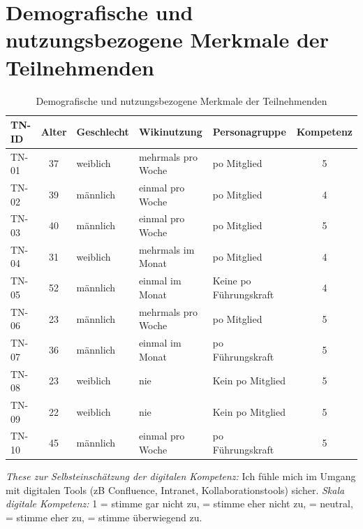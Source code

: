 \section{Demografische und nutzungsbezogene Merkmale der Teilnehmenden}
\label{sec:BB-03_demografie}

\begin{table}[H]
\centering
\caption{Demografische und nutzungsbezogene Merkmale der Teilnehmenden}
\label{tab:BB-demografie}
\begin{tabularx}{\textwidth}{l c l l l c}
\toprule
TN-ID & Alter & Geschlecht & Wikinutzung & Personagruppe & Kompetenz \\
\midrule
TN-01 & 37 & weiblich & mehrmals pro Woche & \acrshort{po} Mitglied & 5 \\
TN-02 & 39 & männlich & einmal pro Woche & \acrshort{po} Mitglied & 4 \\
TN-03 & 40 & männlich & einmal pro Woche & \acrshort{po} Mitglied & 5 \\
TN-04 & 31 & weiblich & mehrmals im Monat & \acrshort{po} Mitglied & 4 \\
TN-05 & 52 & männlich & einmal im Monat & Keine \acrshort{po} Führungskraft & 4 \\
TN-06 & 23 & männlich & mehrmals pro Woche & \acrshort{po} Mitglied & 5 \\
TN-07 & 36 & männlich & einmal im Monat & \acrshort{po} Führungskraft & 5 \\
TN-08 & 23 & weiblich & nie & Kein \acrshort{po} Mitglied & 5 \\
TN-09 & 22 & weiblich & nie & Kein \acrshort{po} Mitglied & 5 \\
TN-10 & 45 & männlich & einmal pro Woche & \acrshort{po} Führungskraft & 5 \\
\bottomrule
\end{tabularx}

\vspace{0.5em}
\footnotesize
\textit{These zur Selbsteinschätzung der digitalen Kompetenz:} Ich fühle mich im Umgang mit digitalen Tools (\acrshort{zB} Confluence, Intranet, Kollaborationstools) sicher.
\textit{Skala digitale Kompetenz:} 
1 = stimme gar nicht zu, = stimme eher nicht zu, = neutral, = stimme eher zu, = stimme überwiegend zu.\\
\end{table}

\newpage
